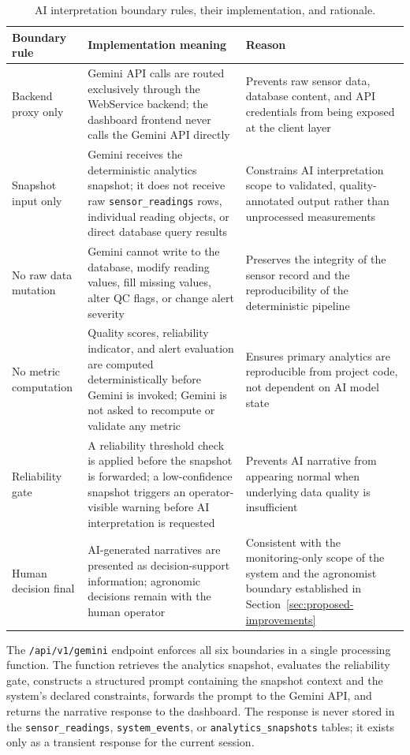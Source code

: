 \begin{table}[H]
\centering
\caption{AI interpretation boundary rules, their implementation, and rationale.}
\label{tab:ai-boundary}
\small
\begin{tabular}{p{3.5cm} p{5.0cm} p{5.0cm}}
\hline
\textbf{Boundary rule} & \textbf{Implementation meaning} & \textbf{Reason} \\
\hline
Backend proxy only & Gemini API calls are routed exclusively through the WebService backend; the dashboard frontend never calls the Gemini API directly & Prevents raw sensor data, database content, and API credentials from being exposed at the client layer \\
\hline
Snapshot input only & Gemini receives the deterministic analytics snapshot; it does not receive raw \texttt{sensor\_readings} rows, individual reading objects, or direct database query results & Constrains AI interpretation scope to validated, quality-annotated output rather than unprocessed measurements \\
\hline
No raw data mutation & Gemini cannot write to the database, modify reading values, fill missing values, alter QC flags, or change alert severity & Preserves the integrity of the sensor record and the reproducibility of the deterministic pipeline \\
\hline
No metric computation & Quality scores, reliability indicator, and alert evaluation are computed deterministically before Gemini is invoked; Gemini is not asked to recompute or validate any metric & Ensures primary analytics are reproducible from project code, not dependent on AI model state \\
\hline
Reliability gate & A reliability threshold check is applied before the snapshot is forwarded; a low-confidence snapshot triggers an operator-visible warning before AI interpretation is requested & Prevents AI narrative from appearing normal when underlying data quality is insufficient \\
\hline
Human decision final & AI-generated narratives are presented as decision-support information; agronomic decisions remain with the human operator & Consistent with the monitoring-only scope of the system and the agronomist boundary established in Section~\ref{sec:proposed-improvements} \\
\hline
\end{tabular}
\end{table}

The \texttt{/api/v1/gemini} endpoint enforces all six boundaries in a single processing function. The function retrieves the analytics snapshot, evaluates the reliability gate, constructs a structured prompt containing the snapshot context and the system's declared constraints, forwards the prompt to the Gemini API, and returns the narrative response to the dashboard. The response is never stored in the \texttt{sensor\_readings}, \texttt{system\_events}, or \texttt{analytics\_snapshots} tables; it exists only as a transient response for the current session.

